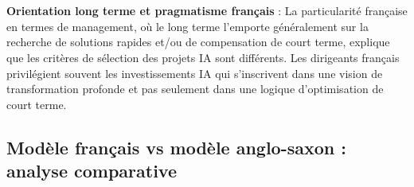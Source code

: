 \\\\
\textbf{Orientation long terme et pragmatisme français} : La particularité française en termes de management, où le long terme l'emporte généralement sur la recherche de solutions rapides et/ou de compensation de court terme, explique que les critères de sélection des projets IA sont différents. Les dirigeants français privilégient souvent les investissements IA qui s'inscrivent dans une vision de transformation profonde et pas seulement dans une logique d'optimisation de court terme.

\subsection{Modèle français vs modèle anglo-saxon : analyse comparative}

